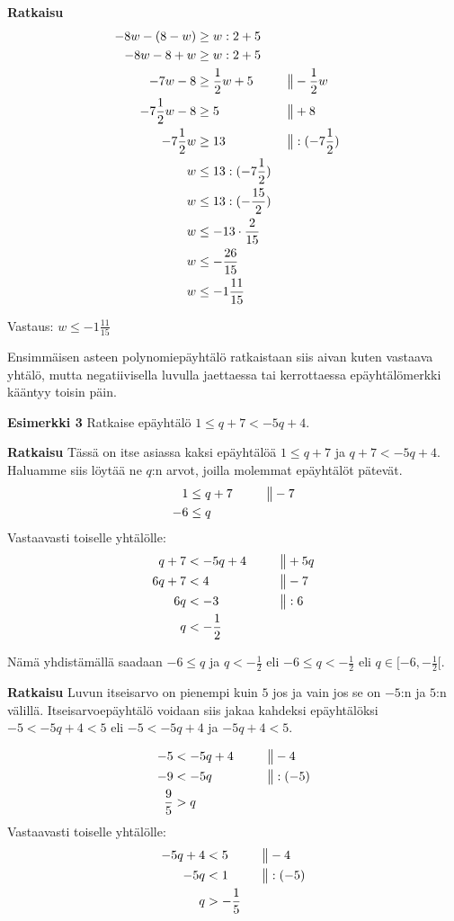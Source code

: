 \textbf{Ratkaisu}
\begin{align*}
-8w-(8-w)&\geq w:2+5 \\
-8w-8+w&\geq w:2+5 \\
-7w-8&\geq \frac12 w+5  \ \ \ \ \ &&\big\| -\frac12 w \\
-7\frac12 w-8&\geq 5  \ \ \ \ \ &&\big\| +8 \\
-7\frac12 w&\geq 13  \ \ \ \ \ &&\big\| :(-7\frac12) \\
w&\leq 13:(-7\frac12) \\
w&\leq 13:(-\frac{15}{2}) \\
w&\leq -13\cdot \frac{2}{15} \\
w&\leq -\frac{26}{15} \\
w&\leq -1\frac{11}{15}
\end{align*}

Vastaus: $w\leq -1\frac{11}{15}$

Ensimmäisen asteen polynomiepäyhtälö ratkaistaan siis aivan kuten vastaava yhtälö, mutta negatiivisella luvulla jaettaessa tai kerrottaessa epäyhtälömerkki kääntyy toisin päin.

\textbf{Esimerkki 3}
Ratkaise epäyhtälö $1\leq q+7<-5q+4$.

\textbf{Ratkaisu}
Tässä on itse asiassa kaksi epäyhtälöä $1\leq q+7$ ja $q+7<-5q+4$. Haluamme siis löytää ne $q$:n arvot, joilla molemmat epäyhtälöt pätevät.
\begin{align*}
1&\leq q+7 \ \ \ \ \ &&\big\| -7 \\
-6&\leq q
\end{align*}
Vastaavasti toiselle yhtälölle:
\begin{align*}
q+7&<-5q+4  \ \ \ \ \ &&\big\| +5q \\
6q+7&<4 &&\big\| -7 \\
6q&<-3 &&\big\| :6 \\
q&< -\frac12 \\
\end{align*}

Nämä yhdistämällä saadaan $-6\leq q$ ja $q< -\frac12$ eli $-6\leq q < -\frac12$ eli $q\in [-6, -\frac12[$.


\textbf{Ratkaisu}
Luvun itseisarvo on pienempi kuin $5$ jos ja vain jos se on $-5$:n ja $5$:n välillä.
Itseisarvoepäyhtälö voidaan siis jakaa kahdeksi epäyhtälöksi $-5<-5q+4<5$ eli $-5<-5q+4$ ja $-5q+4<5$.

\begin{align*}
-5&<-5q+4 \ \ \ \ \ &&\big\| -4 \\
-9&<-5q &&\big\| :(-5) \\
\frac95&>q
\end{align*}
Vastaavasti toiselle yhtälölle:
\begin{align*}
-5q+4&<5  \ \ \ \ \ &&\big\| -4 \\
-5q&<1 &&\big\| :(-5) \\
q&>-\frac15 \\
\end{align*}

